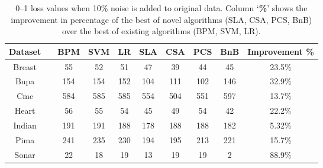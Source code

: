 \begin{table}[htbp!]
\centering
\begin{tabular}{|cc|  ccc|cccc|c|}
\hline\hline
{\bf Dataset} && {\bf BPM} & {\bf SVM} & {\bf LR} & {\bf SLA} & {\bf CSA} & {\bf PCS} & {\bf BnB} & {\bf Improvement \% }\\
\hline
Breast 	&& 55 & 52 & 51 & 47 		& 39 & 44 & 45 & 23.5\%\\  
Bupa 	&& 154 & 154 & 152 & 104 	& 111 & 102 & 146 & 32.9\%\\   
Cmc 		&& 584 & 585 & 585 & 554 	& 504 & 551 & 597 & 13.7\%\\   
Heart 	&& 56 & 55 & 54 & 45 		& 49 & 54 & 42 & 22.2\%\\  
Indian 	&& 191 & 191 & 188 & 178 	& 188 & 188 & 182 & 5.32\%\\    
Pima 	&& 241 & 235 & 230 & 194 	& 195 & 213 & 221 & 15.7\%\\    
Sonar 	&& 22 & 18 & 19 & 13 		& 19 & 19 & 2 & 88.9\%\\ 
\hline\hline
\end{tabular}
\caption{0--1 loss values when 10\% noise is added to original data.
Column `{\bf \%}' shows the improvement in percentage of the
  best of novel algorithms (SLA, CSA, PCS, BnB) over the best of
  existing algorithms (BPM, SVM, LR).} 
\label{tab:losses1noise}
\end{table}

